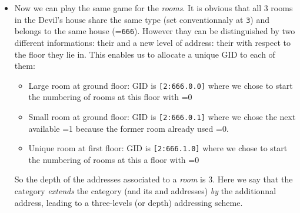 \begin{itemize}
\item  Now we  can play  the  same game  for the  \emph{rooms}. It  is
  obvious that  all 3 rooms in  the Devil's house share  the same type
  (set  conventionnaly at \texttt{3})  and belongs  to the  same house
  (=\texttt{666}).     However     thay    can    be
  distinguished     by    two     different     informations:    their
     and    a   new   level    of   address:   their
    with  respect to  the  floor  they  lie in.  This
  enables us to allocate a unique GID to each of them:
  \begin{itemize}
 
  \item Large room at ground floor: GID is \verb+[2:666.0.0]+ where we
    chose  to  start  the  numbering  of  rooms  at  this  floor  with
    =0
 
  \item Small room at ground floor: GID is \verb+[2:666.0.1]+ where we
    chose  the next available  =1 because  the former
    room already used =0.

  \item Unique  room at first floor: GID  is \verb+[2:666.1.0]+ where
    we chose  to start  the numbering  of rooms at  this a  floor with
    =0

  \end{itemize}
So the depth of the addresses  associated to a \emph{room} is 3.  Here
we  say  that the    category  \emph{extends} the  
category (and its  and  addresses)
\emph{by}  the additionnal   address,  leading  to a
three-levels (or depth) addressing scheme.


\end{itemize}
